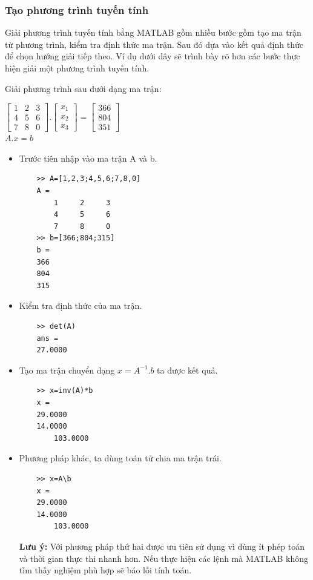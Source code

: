 \documentclass[12pt,a4paper]{article}
\begin{document}
\subsubsection{Tạo phương trình tuyến tính}
Giải phương trình tuyến tính bằng MATLAB gồm nhiều bước gồm tạo ma trận từ phương trình, kiểm tra định thức ma trận. Sau đó dựa vào kết quả định thức để chọn hướng giải tiếp theo. Ví dụ dưới dây sẽ trình bày rõ hơn các bước thực hiện giải một phương trình tuyến tính.
\begin{example}
Giải phương trình sau dưới dạng ma trận:
\begin{center}
	$\begin{bmatrix} 1 & 2 & 3 \\ 4 & 5 & 6 \\ 7 & 8 & 0 \end{bmatrix}.\begin{bmatrix} { x }_{ 1 } \\ { x }_{ 2 } \\ { x }_{ 3 } \end{bmatrix}=\begin{bmatrix} 366 \\ 804 \\ 351 \end{bmatrix}$\\
	$A.x=b$
\end{center}
\begin{itemize}
	\item Trước tiên nhập vào ma trận A và b.
\begin{lstlisting}
	>> A=[1,2,3;4,5,6;7,8,0]
	A =
     	1     2     3
     	4     5     6
     	7     8     0
	>> b=[366;804;315]
	b =
   	366
   	804
   	315
\end{lstlisting}
	\item Kiểm tra định thức của ma trận.
\begin{lstlisting}
	>> det(A)
	ans =
   	27.0000
\end{lstlisting}
	\item Tạo ma trận chuyển dạng $x=A^{-1}.b$ ta được kết quả.
\begin{lstlisting}
	>> x=inv(A)*b
	x =
   	29.0000
   	14.0000
  		103.0000
\end{lstlisting}
	\item Phương pháp khác, ta dùng toán tử chia ma trận trái.
\begin{lstlisting}
	>> x=A\b
	x =
   	29.0000
   	14.0000
  		103.0000
\end{lstlisting}
\textbf{Lưu ý:} Với phương pháp thứ hai được ưu tiên sử dụng vì dùng ít phép toán và thời gian thực thi nhanh hơn. Nếu thực hiện các lệnh mà MATLAB không tìm thấy nghiệm phù hợp sẽ báo lỗi tính toán.
\end{itemize}	
\end{example}
\end{document}

